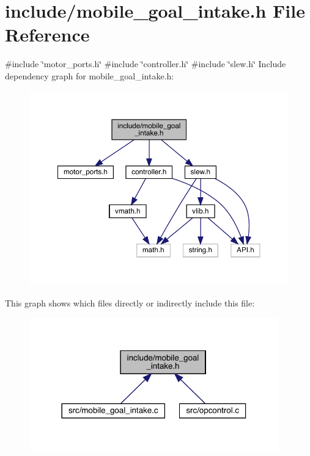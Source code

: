 \section{include/mobile\+\_\+goal\+\_\+intake.h File Reference}
\label{mobile__goal__intake_8h}
{\ttfamily \#include \char`\"{}motor\+\_\+ports.\+h\char`\"{}}\newline
{\ttfamily \#include \char`\"{}controller.\+h\char`\"{}}\newline
{\ttfamily \#include \char`\"{}slew.\+h\char`\"{}}\newline
Include dependency graph for mobile\+\_\+goal\+\_\+intake.\+h\+:\nopagebreak
\begin{figure}[H]
\begin{center}
\leavevmode
\includegraphics[width=350pt]{mobile__goal__intake_8h__incl}
\end{center}
\end{figure}
This graph shows which files directly or indirectly include this file\+:\nopagebreak
\begin{figure}[H]
\begin{center}
\leavevmode
\includegraphics[width=306pt]{mobile__goal__intake_8h__dep__incl}
\end{center}
\end{figure}
